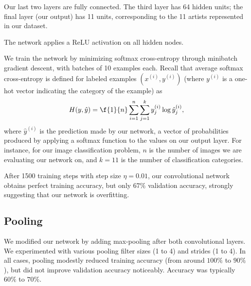 \documentclass{article}
\newcommand{\sind}[1]{^{(#1)}}
\begin{document}
\begin{multicols}{2}
Our last two layers are fully connected.
The third layer has 64 hidden units;
the final layer (our output) has 11 units,
corresponding to the 11 artists represented in our dataset.

The network applies a ReLU activation on all hidden nodes.

We train the network by minimizing softmax cross-entropy
through minibatch gradient descent,
with batches of 10 examples each.
Recall that average softmax cross-entropy is defined
for labeled examples $(x\sind{i}, y\sind{i})$
(where $y\sind{i}$ is a one-hot vector indicating the category of the example)
as
\begin{equation}
    H(y, \hat y) = \f{1}{n}\sum_{i=1}^n
                             \sum_{j=1}^k
                               y\sind{i}_j \log \hat y\sind{i}_j,
\end{equation}
where $\hat y\sind{i}$ is the prediction made by our network,
a vector of probabilities
produced by applying a softmax function
to the values on our output layer.
For instance, for our image classification problem,
$n$ is the number of images we are evaluating our network on,
and $k=11$ is the number of classification categories.

After 1500 training steps with step size $\eta = 0.01$,
our convolutional network obtains perfect training accuracy,
but only $67\%$ validation accuracy,
strongly suggesting that our network is overfitting.

\subsection{Pooling}

We modified our network by adding max-pooling
after both convolutional layers.
We experimented with various pooling filter sizes (1 to 4)
and strides (1 to 4).
In all cases,
pooling modestly reduced training accuracy
(from around $100\%$ to $90\%$),
but did not improve validation accuracy noticeably.
Accuracy was typically $60\%$ to $70\%$.


\end{multicols}
\end{document}
